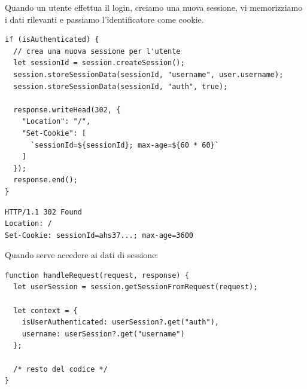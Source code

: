 Quando un utente effettua il login, creiamo una nuova sessione, vi memorizziamo
i dati rilevanti e passiamo l'identificatore come cookie.

\begin{affianco}[0.5][c]
\codicepiccolo
\begin{lstlisting}[style=js, name=login.js]
if (isAuthenticated) {
  // crea una nuova sessione per l'utente
  let sessionId = session.createSession();
  session.storeSessionData(sessionId, "username", user.username);
  session.storeSessionData(sessionId, "auth", true);

  response.writeHead(302, {
    "Location": "/",
    "Set-Cookie": [
      `sessionId=${sessionId}; max-age=${60 * 60}`
    ]
  });
  response.end();
}
\end{lstlisting}
\risultato
\begin{lstlisting}[style=http, name=Risposta generata]
HTTP/1.1 302 Found
Location: /
Set-Cookie: sessionId=ahs37...; max-age=3600
\end{lstlisting}
\end{affianco}

Quando serve accedere ai dati di sessione:

\begin{affianco}[0.55][c]
\begin{lstlisting}[style=js, name=router.js]
function handleRequest(request, response) {
  let userSession = session.getSessionFromRequest(request);

  let context = {
    isUserAuthenticated: userSession?.get("auth"),
    username: userSession?.get("username")
  };

  /* resto del codice */
}
\end{lstlisting}
\risultato
\begin{immagine}
\end{immagine}
\end{affianco}

